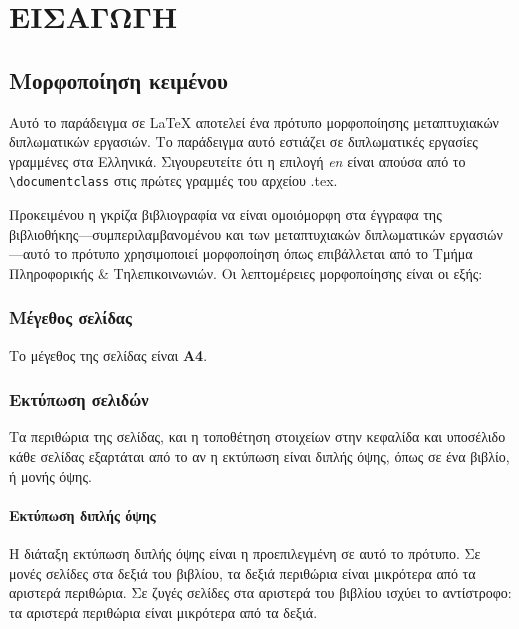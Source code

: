 \documentclass[inscr,ack,preface]{dimscthesis}
\begin{document}
\frontmatter

\mainmatter

\chapter{ΕΙΣΑΓΩΓΗ} \label{introduction}

\section{Μορφοποίηση κειμένου} \label{text_formatting}

Αυτό το παράδειγμα σε \LaTeX{} αποτελεί ένα πρότυπο μορφοποίησης μεταπτυχιακών διπλωματικών εργασιών.
Το παράδειγμα αυτό εστιάζει σε διπλωματικές εργασίες γραμμένες στα Ελληνικά.
Σιγουρευτείτε ότι η επιλογή \emph{en} είναι απούσα από το \verb|\documentclass| στις πρώτες γραμμές του αρχείου .tex.

Προκειμένου η γκρίζα βιβλιογραφία να είναι ομοιόμορφη στα έγγραφα της βιβλιοθήκης---συμπεριλαμβανομένου και των μεταπτυχιακών διπλωματικών εργασιών---αυτό το πρότυπο χρησιμοποιεί μορφοποίηση όπως επιβάλλεται από το Τμήμα Πληροφορικής \& Τηλεπικοινωνιών.
Οι λεπτομέρειες μορφοποίησης είναι οι εξής:

\subsection{Μέγεθος σελίδας} \label{page_size}

Το μέγεθος της σελίδας είναι \textbf{A4}.

\subsection{Εκτύπωση σελιδών} \label{printing_pages}

Τα περιθώρια της σελίδας, και η τοποθέτηση στοιχείων στην κεφαλίδα και υποσέλιδο κάθε σελίδας εξαρτάται από το αν η εκτύπωση είναι διπλής όψης, όπως σε ένα βιβλίο, ή μονής όψης.

\subsubsection{Εκτύπωση διπλής όψης} \label{two-sided_printing}

Η διάταξη εκτύπωση διπλής όψης είναι η προεπιλεγμένη σε αυτό το πρότυπο.
Σε μονές σελίδες στα δεξιά του βιβλίου, τα δεξιά περιθώρια είναι μικρότερα από τα αριστερά περιθώρια.
Σε ζυγές σελίδες στα αριστερά του βιβλίου ισχύει το αντίστροφο: τα αριστερά περιθώρια είναι μικρότερα από τα δεξιά.
\end{document}
